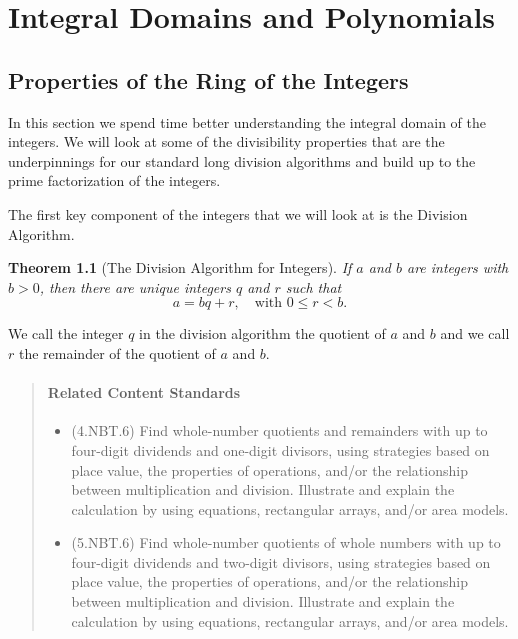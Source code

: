 \documentclass[
]{book}
\providecommand{\tightlist}{%
  \setlength{\itemsep}{0pt}\setlength{\parskip}{0pt}}
\newtheorem{theorem}{Theorem}[chapter]
\theoremstyle{definition}
\theoremstyle{definition}
\theoremstyle{definition}
\theoremstyle{remark}
\begin{document}
\hypertarget{ch:rings}{%
\chapter{Integral Domains and Polynomials}\label{ch:rings}}

\hypertarget{sec:Integer-Ring}{%
\section{Properties of the Ring of the Integers}\label{sec:Integer-Ring}}

In this section we spend time better understanding the integral domain of the integers. We will look at some of the divisibility properties that are the underpinnings for our standard long division algorithms and build up to the prime factorization of the integers.

The first key component of the integers that we will look at is the Division Algorithm.

\begin{theorem}[The Division Algorithm for Integers]
\protect\hypertarget{thm:division-algorithm}{}{\label{thm:division-algorithm} {} }If \(a\) and \(b\) are integers with \(b>0\), then there are unique integers \(q\) and \(r\) such that \[a=bq+r, \quad \mbox{with } 0\leq r <b.\]
\end{theorem}

We call the integer \(q\) in the division algorithm the quotient of \(a\) and \(b\) and we call \(r\) the remainder of the quotient of \(a\) and \(b\).

\begin{quote}
\hypertarget{related-content-standards-28}{%
\subsubsection*{Related Content Standards}\label{related-content-standards-28}}

\begin{itemize}
\tightlist
\item
  (4.NBT.6) Find whole-number quotients and remainders with up to four-digit dividends and one-digit divisors, using strategies based on place value, the properties of operations, and/or the relationship between multiplication and division. Illustrate and explain the calculation by using equations, rectangular arrays, and/or area models.
\item
  (5.NBT.6) Find whole-number quotients of whole numbers with up to four-digit dividends and two-digit divisors, using strategies based on place value, the properties of operations, and/or the relationship between multiplication and division. Illustrate and explain the calculation by using equations, rectangular arrays, and/or area models.
\end{itemize}
\end{quote}
\end{document}
